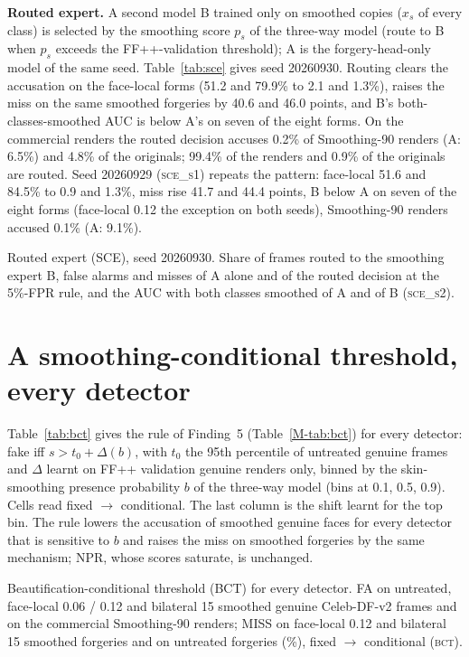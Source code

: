 \documentclass[10pt]{article}
\begin{document}
\textbf{Routed expert.} A second model B trained only on smoothed copies ($x_s$ of every class) is selected by the smoothing
score $p_s$ of the three-way model (route to B when $p_s$ exceeds the FF++-validation threshold); A is the forgery-head-only
model of the same seed. Table~\ref{tab:sce} gives seed 20260930. Routing clears the accusation on
the face-local forms (51.2 and 79.9\% to 2.1 and 1.3\%), raises the miss on the same smoothed forgeries by 40.6 and 46.0
points, and B's both-classes-smoothed AUC is below A's on seven of the eight forms. On the commercial renders the routed
decision accuses 0.2\% of Smoothing-90 renders (A: 6.5\%) and 4.8\% of the originals; 99.4\% of the renders and 0.9\% of the
originals are routed. Seed 20260929 (\textsc{sce\_s1}) repeats the pattern: face-local 51.6 and 84.5\% to 0.9 and 1.3\%, miss rise
41.7 and 44.4 points, B below A on seven of the eight forms (face-local 0.12 the exception on both seeds), Smoothing-90 renders
accused 0.1\% (A: 9.1\%).
\begin{table}[H]
\centering
\caption{Routed expert (SCE), seed 20260930. Share of frames routed to the smoothing expert B, false alarms and misses of A
alone and of the routed decision at the 5\%-FPR rule, and the AUC with both classes smoothed of A and of B (\textsc{sce\_s2}).}
\label{tab:sce}
\scriptsize
\begin{adjustbox}{max width=\linewidth}\end{adjustbox}
\end{table}

\section{A smoothing-conditional threshold, every detector}
\label{sec:bct}
Table~\ref{tab:bct} gives the rule of Finding~5 (Table~\ref{M-tab:bct}) for every detector: fake iff $s>t_0+\Delta(b)$, with
$t_0$ the 95th percentile of untreated genuine frames and $\Delta$ learnt on FF++ validation genuine renders only, binned by the
skin-smoothing presence probability $b$ of the three-way model (bins at 0.1, 0.5, 0.9). Cells read fixed $\rightarrow$
conditional. The last column is the shift learnt for the top bin. The rule lowers the accusation of smoothed genuine faces for
every detector that is sensitive to $b$ and raises the miss on smoothed forgeries by the same mechanism; NPR, whose scores
saturate, is unchanged.
\begin{table}[H]
\centering
\caption{Beautification-conditional threshold (BCT) for every detector. FA on untreated, face-local 0.06 / 0.12
and bilateral 15 smoothed genuine Celeb-DF-v2 frames and on the commercial Smoothing-90 renders; MISS on face-local 0.12 and
bilateral 15 smoothed forgeries and on untreated forgeries (\%), fixed $\rightarrow$ conditional (\textsc{bct}).}
\label{tab:bct}
\scriptsize
\begin{adjustbox}{max width=\linewidth}\end{adjustbox}
\end{table}
\end{document}
